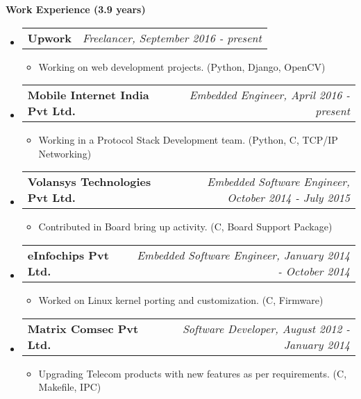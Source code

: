 \documentclass[letterpaper,10pt]{article}
\makeatletter
\newcommand{\resitem}[1]{\item #1 \vspace{-2pt}}
\newcommand{\resheading}[1]{{\large \colorbox{mygrey}{\begin{minipage}{\textwidth}{\textbf{#1 \vphantom{p\^{E}}}}\end{minipage}}}}
\newcommand{\ressubheading}[4]{
\begin{tabular*}{7.0in}{l@{\extracolsep{\fill}}r}
		\textbf{#1} & \textit{#4} \\
\end{tabular*}\vspace{-6pt}}
\makeatother
\begin{document}
\resheading{Work Experience (3.9 years)}
\begin{itemize}

\item
	\ressubheading{Upwork}{Remote}{}{Freelancer, September 2016 - present}
	\begin{itemize}
		\resitem{Working on web development projects.}(Python, Django, OpenCV)
	\end{itemize}

\item
	\ressubheading{Mobile Internet India Pvt Ltd.}{Ahmedabad, India}{}{Embedded Engineer, April 2016 - present}
	\begin{itemize}
		\resitem{Working in a Protocol Stack Development team.}(Python, C, TCP/IP Networking)
	\end{itemize}

\item
	\ressubheading{Volansys Technologies Pvt Ltd.}{Ahmedabad, India}{}{Embedded Software Engineer, October 2014 - July 2015}
	\begin{itemize}
		\resitem{Contributed in Board bring up activity.}(C, Board Support Package)
	\end{itemize}

\item
	\ressubheading{eInfochips Pvt Ltd.}{Ahmedabad, India}{}{Embedded Software Engineer, January 2014 - October 2014}
	\begin{itemize}
		\resitem{Worked on Linux kernel porting and customization.}(C, Firmware)
	\end{itemize}

\item
	\ressubheading{Matrix Comsec Pvt Ltd.}{Ahmedabad, India}{}{Software Developer, August 2012 - January 2014}
	\begin{itemize}
		\resitem{Upgrading Telecom products with new features as per requirements.}(C, Makefile, IPC)
	\end{itemize}

\end{itemize}
\end{document}
